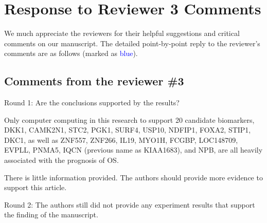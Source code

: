 \documentclass[preprint,12pt]{elsarticle}
\begin{document}
\section*{Response to Reviewer 3 Comments}
We much appreciate the reviewers for their helpful suggestions and critical comments on our manuscript. The detailed point-by-point reply to the reviewer's comments are as follows (marked as \textcolor{blue}{blue}). 


\subsection*{Comments from the reviewer \#3}

Round 1:
Are the conclusions supported by the results?

Only computer computing in this research to support 20 candidate biomarkers, DKK1, CAMK2N1, STC2, PGK1, SURF4, USP10, NDFIP1, FOXA2, STIP1, DKC1, as well as ZNF557, ZNF266, IL19, MYO1H, FCGBP, LOC148709, EVPLL, PNMA5, IQCN (previous name as KIAA1683), and NPB, are all heavily associated with the prognosis of OS.

There is little information provided. The authors should provide more evidence to support this article.

Round 2:
The authors still did not provide any experiment results that support the finding of the manuscript.
\end{document}
